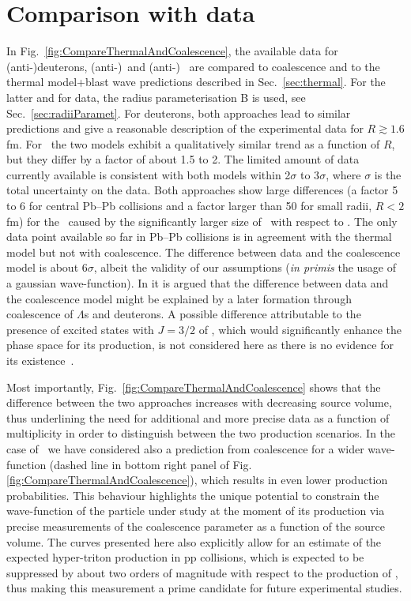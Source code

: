 \section{Comparison with data}
In Fig.~\ref{fig:CompareThermalAndCoalescence}, the available data for (anti-)deuterons, \mbox{(anti-)}\hethree\ and (anti-)\hthreelambda~\cite{Adam:2015yta} are compared to coalescence and to the thermal model+blast wave predictions described in Sec.~\ref{sec:thermal}.
For the latter and for data, the radius parameterisation B is used, see Sec.~\ref{sec:radiiParamet}. 
For deuterons, both approaches lead to similar predictions and give a reasonable description of the experimental data for $R \gtrsim 1.6$ fm. 
For \hethree~the two models exhibit a qualitatively similar trend as a function of $R$, but they differ by a factor of about 1.5 to 2. The limited amount of data currently available is consistent with both models within 2$\sigma$ to 3$\sigma$, where $\sigma$ is the total uncertainty on the data. 
Both approaches show large differences (a factor 5 to 6 for central Pb--Pb collisions and a factor larger than 50 for small radii, $R < 2$ fm) for the \hthreelambda\ caused by the significantly larger size of \hthreelambda\ with respect to \hethree. 
The only data point available so far in Pb--Pb collisions is in agreement with the thermal model but not with coalescence. 
The difference between data and the coalescence model is about 6$\sigma$,
albeit the validity of our assumptions (\textit{in primis} the usage of a gaussian wave-function).
In \cite{Zhang:2018euf} it is argued that the difference between data and the coalescence model might be explained by a later formation through coalescence of $\Lambda$s and deuterons. 
A possible difference attributable to the presence of excited states with $J=3/2$ of \hthreelambda, which would significantly enhance the phase space for its production, is not considered here as there is no evidence for its existence~\cite{Mart:1996ay}. 

Most importantly, Fig.~\ref{fig:CompareThermalAndCoalescence} shows that the difference between the two approaches increases with decreasing source volume, thus underlining the need for additional and more precise data as a function of multiplicity in order to distinguish between the two production scenarios. 
In the case of \hthreelambda~we have considered also a prediction from coalescence for a wider wave-function (dashed line in bottom right panel of Fig. \ref{fig:CompareThermalAndCoalescence}), which results in even lower production probabilities. This behaviour highlights the unique potential to constrain the wave-function of the particle under study at the moment of its production via precise measurements of the coalescence parameter as a function of the source volume. The curves presented here also explicitly allow for an estimate of the expected hyper-triton production in pp collisions, which is expected to be suppressed by about two orders of magnitude with respect to the production of \hethree, thus making this measurement a prime candidate for future experimental studies.



